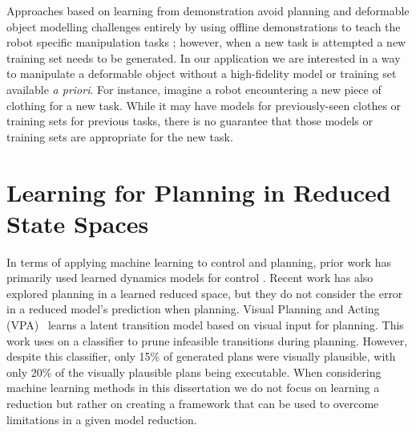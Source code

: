 Approaches based on learning from demonstration avoid planning and deformable object modelling challenges entirely by using offline demonstrations to teach the robot specific manipulation tasks \cite{Huang2015, Schulman2016}; however, when a new task is attempted a new training set needs to be generated. In our application we are interested in a way to manipulate a deformable object without a high-fidelity model or training set available \textit{a priori}. For instance, imagine a robot encountering a new piece of clothing for a new task. While it may have models for previously-seen clothes or training sets for previous tasks, there is no guarantee that those models or training sets are appropriate for the new task.


\section{Learning for Planning in Reduced State Spaces}

In terms of applying machine learning to control and planning, prior work has primarily used learned dynamics models for control \cite{Finn2017, Banijamali2017, Jia2018, Zhang2019, Sutanto2019}. Recent work \cite{ichter2019} has also explored planning in a learned reduced space, but they do not consider the error in a reduced model's prediction when planning. Visual Planning and Acting (VPA)~\cite{vpa2019rss} learns a latent transition model based on visual input for planning. This work uses on a classifier to prune infeasible transitions during planning. However, despite this classifier, only 15\% of generated plans were visually plausible, with only 20\% of the visually plausible plans being executable. When considering machine learning methods in this dissertation we do not focus on learning a reduction but rather on creating a framework that can be used to overcome limitations in a given model reduction.